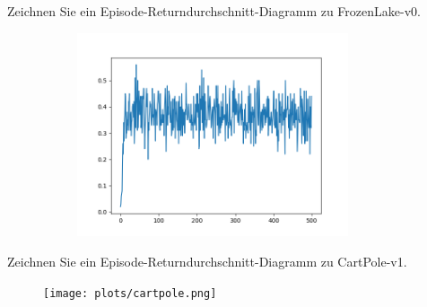 \documentclass{ocbeameruni}
\begin{document}
\begin{frame}{1.3}
Zeichnen Sie ein Episode-Returndurchschnitt-Diagramm zu FrozenLake-v0.
\begin{figure}[ht]
    \centering
    \includegraphics[width=100mm, height=60mm]{plots/frozen.png} 
\end{figure}
\end{frame}

\begin{frame}{1.3}
Zeichnen Sie ein Episode-Returndurchschnitt-Diagramm zu CartPole-v1.
\begin{figure}[ht]
    \centering
    \texttt{[image: plots/cartpole.png]} 
\end{figure}
\end{frame}
\end{document}
